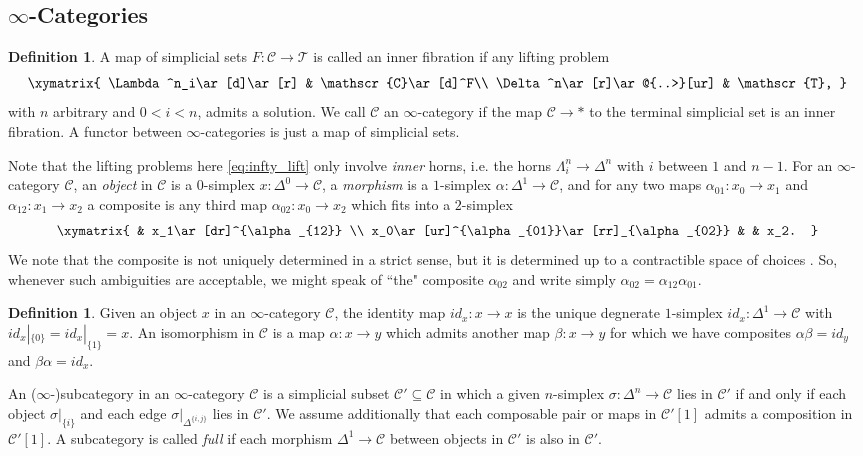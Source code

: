 \documentclass[reqno]{amsart}
\theoremstyle{definition}
\newtheorem{definition}[lemma]{Definition}
\newcommand{\msc}[1]{\mathscr{#1}}
\renewcommand{\1}{\mathbf{1}}
\begin{document}
\subsection{$\infty$-Categories}

\begin{definition}
A map of simplicial sets $F:\msc{C}\to \msc{T}$ is called an inner fibration if any lifting problem
\begin{equation}\label{eq:infty_lift}
\xymatrix{
\Lambda^n_i\ar[d]\ar[r] & \msc{C}\ar[d]^F\\
\Delta^n\ar[r]\ar@{..>}[ur] & \msc{T},
}
\end{equation}
with $n$ arbitrary and $0<i<n$, admits a solution.  We call $\msc{C}$ an $\infty$-category if the map $\msc{C}\to \ast$ to the terminal simplicial set is an inner fibration.  A functor between $\infty$-categories is just a map of simplicial sets.
\end{definition}

Note that the lifting problems here \eqref{eq:infty_lift} only involve \emph{inner} horns, i.e. the horns $\Lambda^n_i\to \Delta^n$ with $i$ between $1$ and $n-1$.  For an $\infty$-category $\msc{C}$, an \emph{object} in $\msc{C}$ is a $0$-simplex $x:\Delta^0\to \msc{C}$, a \emph{morphism} is a $1$-simplex $\alpha:\Delta^1\to \msc{C}$, and for any two maps $\alpha_{01}:x_0\to x_1$ and $\alpha_{12}:x_1\to x_2$ a composite is any third map $\alpha_{02}:x_0\to x_2$ which fits into a $2$-simplex
\[
\xymatrix{
 & x_1\ar[dr]^{\alpha_{12}} \\
x_0\ar[ur]^{\alpha_{01}}\ar[rr]_{\alpha_{02}} & & x_2.
}
\]
We note that the composite is not uniquely determined in a strict sense, but it is determined up to a contractible space of choices \cite[\href{https://kerodon.net/tag/01BW}{01BW}]{kerodon}.  So, whenever such ambiguities are acceptable, we might speak of ``the" composite $\alpha_{02}$ and write simply $\alpha_{02}=\alpha_{12}\alpha_{01}$.

\begin{definition}
Given an object $x$ in an $\infty$-category $\msc{C}$, the identity map $id_x:x\to x$ is the unique degnerate $1$-simplex $id_x:\Delta^1\to \msc{C}$ with $id_x|_{\{0\}}=id_x|_{\{1\}}=x$.  An isomorphism in $\msc{C}$ is a map $\alpha:x\to y$ which admits another map $\beta:x\to y$ for which we have composites $\alpha\beta=id_y$ and $\beta\alpha=id_x$.
\end{definition}

An ($\infty$-)subcategory in an $\infty$-category $\msc{C}$ is a simplicial subset $\msc{C}'\subseteq \msc{C}$ in which a given $n$-simplex $\sigma:\Delta^n\to \msc{C}$ lies in $\msc{C}'$ if and only if each object $\sigma|_{\{i\}}$ and each edge $\sigma|_{\Delta^{\{i,j\}}}$ lies in $\msc{C}'$.  We assume additionally that each composable pair or maps in $\msc{C}'[1]$ admits a composition in $\msc{C}'[1]$. A subcategory is called \emph{full} if each morphism $\Delta^1\to \msc{C}$ between objects in $\msc{C}'$ is also in $\msc{C}'$.
\end{document}
